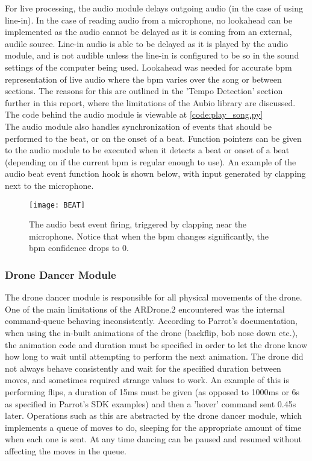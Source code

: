 For live processing, the audio module delays outgoing audio (in the case of using line-in). In the case of
reading audio from a microphone, no lookahead can be implemented as the audio cannot be delayed as it is coming
from an external, audile source. Line-in audio is able to be delayed as it is played by the audio module, and is
not audible unless the line-in is configured to be so in the sound settings of the computer being used. Lookahead
was needed for accurate bpm representation of live audio where the bpm varies over the song or between sections.
The reasons for this are outlined in the 'Tempo Detection' section further in this report, where the limitations
of the Aubio library are discussed. The code behind the audio module is viewable at \eqref{code:play_song.py}\\

The audio module also handles synchronization of events that should be performed to the beat, or on the onset of
a beat. Function pointers can be given to the audio module to be executed when it detects a beat or onset of a
beat (depending on if the current bpm is regular enough to use). An example of the audio beat event function hook
is shown below, with input generated by clapping next to the microphone.\\

\begin{figure}[h]
    \centering
    \texttt{[image: BEAT]}
    \caption{The audio beat event firing, triggered by clapping near the microphone. Notice that when the bpm
    changes significantly, the bpm confidence drops to 0.}
\end{figure}

\subsubsection{Drone Dancer Module}
The drone dancer module is responsible for all physical movements of the drone. One of the main limitations of
the ARDrone.2 encountered was the internal command-queue behaving inconsistently. According to Parrot's
documentation, when using the in-built animations of the drone (backflip, bob nose down etc.), the animation code
and duration must be specified in order to let the drone know how long to wait until attempting to perform the
next animation. The drone did not always behave consistently and wait for the specified duration between moves,
and sometimes required strange values to work. An example of this is performing flips, a duration of 15ms must be
given (as opposed to 1000ms or 6s as specified in Parrot's SDK examples) and then a 'hover' command sent 0.45s
later. Operations such as this are abstracted by the drone dancer module, which implements a queue of moves to
do, sleeping for the appropriate amount of time when each one is sent. At any time dancing can be paused and
resumed without affecting the moves in the queue.\\

